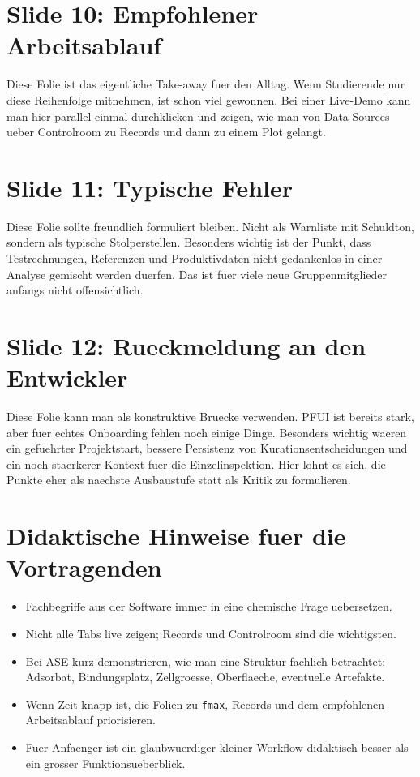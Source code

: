 \documentclass[11pt,a4paper]{article}
\begin{document}
\section*{Slide 10: Empfohlener Arbeitsablauf}
Diese Folie ist das eigentliche Take-away fuer den Alltag. Wenn Studierende nur diese Reihenfolge mitnehmen, ist schon viel gewonnen. Bei einer Live-Demo kann man hier parallel einmal durchklicken und zeigen, wie man von Data Sources ueber Controlroom zu Records und dann zu einem Plot gelangt.

\section*{Slide 11: Typische Fehler}
Diese Folie sollte freundlich formuliert bleiben. Nicht als Warnliste mit Schuldton, sondern als typische Stolperstellen. Besonders wichtig ist der Punkt, dass Testrechnungen, Referenzen und Produktivdaten nicht gedankenlos in einer Analyse gemischt werden duerfen. Das ist fuer viele neue Gruppenmitglieder anfangs nicht offensichtlich.

\section*{Slide 12: Rueckmeldung an den Entwickler}
Diese Folie kann man als konstruktive Bruecke verwenden. PFUI ist bereits stark, aber fuer echtes Onboarding fehlen noch einige Dinge. Besonders wichtig waeren ein gefuehrter Projektstart, bessere Persistenz von Kurationsentscheidungen und ein noch staerkerer Kontext fuer die Einzelinspektion. Hier lohnt es sich, die Punkte eher als naechste Ausbaustufe statt als Kritik zu formulieren.

\section*{Didaktische Hinweise fuer die Vortragenden}
\begin{itemize}
  \item Fachbegriffe aus der Software immer in eine chemische Frage uebersetzen.
  \item Nicht alle Tabs live zeigen; Records und Controlroom sind die wichtigsten.
  \item Bei ASE kurz demonstrieren, wie man eine Struktur fachlich betrachtet: Adsorbat, Bindungsplatz, Zellgroesse, Oberflaeche, eventuelle Artefakte.
  \item Wenn Zeit knapp ist, die Folien zu \texttt{fmax}, Records und dem empfohlenen Arbeitsablauf priorisieren.
  \item Fuer Anfaenger ist ein glaubwuerdiger kleiner Workflow didaktisch besser als ein grosser Funktionsueberblick.
\end{itemize}
\end{document}
